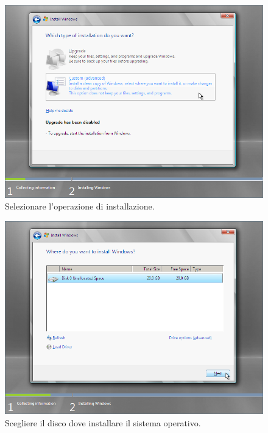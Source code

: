 \begin{figure}[htbp]
 \centering
 \includegraphics[scale=0.5]{images/grab0009}
 \caption{Selezionare l’operazione di installazione.}
\label{fig:grab0009}
\end{figure}

\begin{figure}[htbp]
 \centering
 \includegraphics[scale=0.5]{images/grab0010}
 \caption{Scegliere il disco dove installare il sistema operativo.}
\label{fig:grab0010}
\end{figure}


